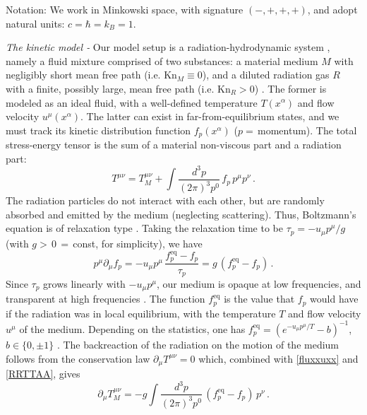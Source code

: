 \documentclass[a4paper, amsfonts, amssymb, amsmath, reprint, showkeys, twoside,notitlepage]{revtex4-2}
\newcommand{\Kn}{\text{Kn}}
\begin{document}
Notation: We work in Minkowski space, with signature $(-,+,+,+)$, and adopt natural units: $c=\hbar=k_B=1$. 

\textit{The kinetic model -} 
Our model setup is a radiation-hydrodynamic system \cite{Pomraning1973,mihalas_book,Farris2008,ShibataRadiation2011k,Sadowski2013,GavassinoRadiazione,RadiceBernuzziRadiation2023zlw}, namely a fluid mixture comprised of two substances: a material medium $M$ with negligibly short mean free path (i.e. $\Kn_M \equiv 0$), and a diluted radiation gas $R$ with a finite, possibly large, mean free path (i.e. $\Kn_R >0$) \cite{Thomas1930,Weinberg1971}. The former is modeled as an ideal fluid, with a well-defined temperature $T(x^\alpha)$ and flow velocity $u^\mu(x^\alpha)$. The latter can exist in far-from-equilibrium states, and we must track its kinetic distribution function $f_p(x^\alpha)$ \cite{UdeyIsrael1982,Thorne1981} ($p=\,$momentum). The total stress-energy tensor is the sum of a material non-viscous part and a radiation part:
\begin{equation}\label{fluxxuxx}
       T^{\mu \nu}= T^{\mu \nu}_M+\int \dfrac{d^3 p }{(2\pi)^3p^0} \, f_p \, p^\mu p^\nu \, . 
\end{equation}
The radiation particles do not interact with each other, but are randomly absorbed and emitted by the medium (neglecting scattering). Thus, Boltzmann's equation is of relaxation type \cite{Pomraning1973,AndersonWitting1974}. Taking the relaxation time to be $\tau_p{=}{-}u_\mu p^\mu/g$ (with $g{>}\,0\,{=}\,$const, for simplicity), we have
\begin{equation}\label{RRTTAA}
   p^\mu \partial_\mu f_p=-u_\mu p^\mu \,  \dfrac{f^{\text{eq}}_p{-}f_p}{\tau_p} =g \, (f^{\text{eq}}_p{-}f_p) \, .
\end{equation}
Since $\tau_p$ grows linearly with $-u_\mu p^\mu$, our medium is opaque at low frequencies, and transparent at high frequencies \cite{Pomraning1973}. The function $f^{\text{eq}}_p$ is the value that $f_p$ would have if the radiation was in local equilibrium, with the temperature $T$ and flow velocity $u^\mu$ of the medium. Depending on the statistics, one has $f^{\text{eq}}_p=(e^{-u_\mu p^\mu/T}{-}b)^{-1}$, $b \in \{0,\pm 1\}$ \cite{rezzolla_book}.
The backreaction of the radiation on the motion of the medium follows from the conservation law $\partial_\mu T^{\mu \nu}=0$ which, combined with \eqref{fluxxuxx} and \eqref{RRTTAA}, gives
\begin{equation}
    \partial_\mu T^{\mu \nu}_M = -g \int \dfrac{d^3 p }{(2\pi)^3p^0} \, (f^{\text{eq}}_p-f_p) \, p^\nu \, .
\end{equation}
\end{document}
